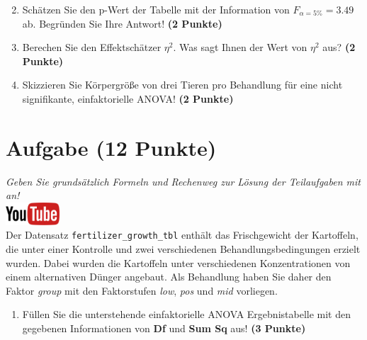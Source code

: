 \documentclass[a4paper, 9pt]{scrartcl}\usepackage[]{graphicx}\usepackage[]{xcolor}
\begin{document}
\vspace{1Ex}

\begin{enumerate}
  \setcounter{enumi}{1}
\item Sch{\"a}tzen Sie den p-Wert der Tabelle mit der Information von
  $F_{\alpha = 5\%} = 3.49$ ab. Begr{\"u}nden Sie Ihre
  Antwort! \textbf{(2 Punkte)}
\item Berechen Sie den Effektsch{\"a}tzer $\eta^2$. Was sagt Ihnen der Wert von
  $\eta^2$ aus? \textbf{(2 Punkte)}
\item Skizzieren Sie K{\"o}rpergr{\"o}{\ss}e von drei Tieren pro Behandlung f{\"u}r eine
  nicht signifikante, einfaktorielle ANOVA! \textbf{(2 Punkte)}
\end{enumerate}



 
\clearpage

\section{Aufgabe \hfill (12 Punkte)}

\textit{Geben Sie grunds{\"a}tzlich Formeln und Rechenweg zur L{\"o}sung der
  Teilaufgaben mit an!} \\[1Ex]

\hfill\href{https://youtu.be/49hvImMwVyE}{\includegraphics[width =
  2cm]{img/youtube}}\\[1Ex]




Der Datensatz \texttt{fertilizer\_growth\_tbl} enth{\"a}lt das Frischgewicht der
Kartoffeln, die unter einer Kontrolle und zwei
verschiedenen Behandlungsbedingungen erzielt wurden. Dabei wurden die
Kartoffeln unter verschiedenen Konzentrationen von einem alternativen
D{\"u}nger angebaut. Als Behandlung haben Sie daher den Faktor \textit{group} mit den
Faktorstufen \textit{low}, \textit{pos} und
\textit{mid} vorliegen.



\begin{enumerate}
\item F{\"u}llen Sie die unterstehende einfaktorielle ANOVA Ergebnistabelle
  mit den gegebenen Informationen von \textbf{Df} und \textbf{Sum Sq} aus!
  \textbf{(3 Punkte)}
\end{enumerate}
\end{document}
